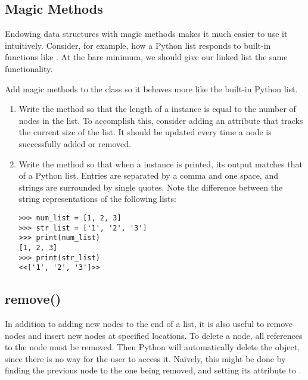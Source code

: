 \subsection*{Magic Methods} %

Endowing data structures with magic methods makes it much easier to use it intuitively.
Consider, for example, how a Python list responds to built-in functions like . %
At the bare minimum, we should give our linked list the same functionality.

\begin{problem} %
Add magic methods to the  class so it behaves more like the built-in Python list.
\begin{enumerate}
\item Write the  method so that the length of a  instance is equal to the number of nodes in the list.
To accomplish this, consider adding an attribute that tracks the current size of the list.
It should be updated every time a node is successfully added or removed.

\item Write the  method so that when a  instance is printed, its output matches that of a Python list.
Entries are separated by a comma and one space, and strings are surrounded by single quotes.
Note the difference between the string representations of the following lists:

\begin{lstlisting}
>>> num_list = [1, 2, 3]
>>> str_list = ['1', '2', '3']
>>> print(num_list)
[1, 2, 3]
>>> print(str_list)
<<['1', '2', '3']>>
\end{lstlisting}
\end{enumerate}
\end{problem}

\subsection*{remove()} %

In addition to adding new nodes to the end of a list, it is also useful to remove nodes and insert new nodes at specified locations.
To delete a node, all references to the node must be removed.
Then Python will automatically delete the object, since there is no way for the user to access it.
Na{\"i}vely, this might be done by finding the previous node to the one being removed, and setting its  attribute to .

